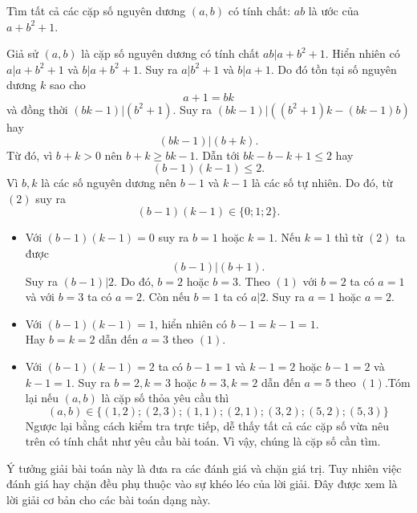 \begin{bt}%
	Tìm tất cả các cặp số nguyên dương $(a,b)$ có tính chất: $ab$  là ước của $ a+b^2+1$.
	\loigiai
	{Giả sử $(a,b)$ là cặp số nguyên dương có tính chất $ab|a+b^2+1$. Hiển nhiên có $a|a+b^2+1$ và $b|a+b^2+1$. Suy ra $a|b^2+1$ và $b|a+1$. Do đó tồn tại số nguyên dương $k$ sao cho
		\begin{equation}
		\tag{1}
		a+1=bk
		\end{equation}
		và đồng thời $(bk-1)|(b^2+1)$. Suy ra $(bk-1)|((b^2+1)k-(bk-1)b)$ hay 
		\begin{equation}
		\tag{2}
		(bk-1)|(b+k).
		\end{equation}
		Từ đó, vì $b+k>0$ nên $b+k\geq bk-1$. Dẫn tới $bk-b-k+1\leq 2$ hay 
		\begin{equation}
		\tag{3}
		(b-1)(k-1)\leq 2.
		\end{equation}
		Vì $b,k$ là các số nguyên dương nên $b-1$ và $k-1$ là các số tự nhiên. Do đó, từ $(2)$ suy ra $$(b-1)(k-1) \in \lbrace 0;1;2\rbrace.$$
		\begin{itemize}
			\item Với $(b-1)(k-1)=0$ suy ra $b=1$ hoặc $k=1$. Nếu $k=1$ thì từ $(2)$ ta được $$(b-1)|(b+1).$$
			Suy ra $(b-1)|2$. Do đó, $b=2$ hoặc $b=3$. Theo $(1)$ với $b=2$ ta có $a=1$ và với $b=3$ ta có $a=2$. Còn nếu $b=1$ ta có $a|2$. Suy ra $a=1$ hoặc $a=2$.
			\item Với $(b-1)(k-1)=1$, hiển nhiên có $b-1=k-1=1$.\\
			Hay $b=k=2$ dẫn đến $a=3$ theo $(1)$.
			\item Với $(b-1)(k-1)=2$ ta có $b-1=1$ và $k-1=2$ hoặc $b-1=2$ và $k-1=1$. Suy ra $b=2,k=3$ hoặc $b=3,k=2$ dẫn đến $a=5$ theo $(1)$.Tóm lại nếu $(a,b)$ là cặp số thỏa yêu cầu thì $$(a,b)\in \lbrace (1,2);(2,3);(1,1);(2,1);(3,2);(5,2);(5,3) \rbrace$$
			Ngược lại bằng cách kiểm tra trực tiếp, dễ thấy tất cả các cặp số vừa nêu trên có tính chất như yêu cầu bài toán. Vì vậy, chúng là cặp số cần tìm.
		\end{itemize}
	\begin{nx}
		Ý tưởng giải bài toán này là đưa ra các đánh giá và chặn giá trị. Tuy nhiên việc đánh giá hay chặn đều phụ thuộc vào sự khéo léo của lời giải. Đây được xem là lời giải cơ bản cho các bài toán dạng này.
	\end{nx}
}
\end{bt}


